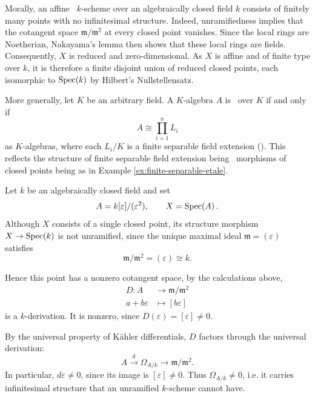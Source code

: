 \begin{remark}
	Morally, an affine \etale\ $k$-scheme over an algebraically
	closed field $k$ consists of finitely many points with no
	infinitesimal structure. Indeed, unramifiedness implies
	that the cotangent space $\mathfrak{m} / \mathfrak{m}^2$ at every closed point vanishes.
	Since the local rings are Noetherian, Nakayama's lemma
	then shows that these local rings are fields.
	Consequently, $X$ is reduced and zero-dimensional.
	As $X$ is affine and of finite type over $k$, it is
	therefore a finite disjoint union of reduced closed
	points, each isomorphic to $\operatorname{Spec}\!\left(k\right)$ by
	Hilbert's Nullstellensatz.
\end{remark}

\begin{remark}
	More generally, let $K$ be an arbitrary field.
	A $K$-algebra $A$ is \etale\ over $K$ if and only if
	\[
	A \cong \prod_{i=1}^{n} L_i
	\]
	as $K$-algebras, where each $L_i/K$ is a finite
	separable field extension
	(\cite[][Tag 02GL]{stacks-project}).
	This reflects the structure of finite separable field extension being \etale\ morphisms of closed points being as in Example \ref{ex:finite-separable-etale}.
\end{remark}

\begin{example}	
	Let $k$ be an algebraically closed field and set
	\[
	A = k[\varepsilon]/(\varepsilon^2),
	\qquad X=\operatorname{Spec}\!\left(A\right).
	\]
	Although $X$ consists of a single closed point,
	its structure morphism $X \to \operatorname{Spec}\!\left(k\right)$ is not
	unramified, since the unique maximal ideal
	$\mathfrak m=(\varepsilon)$ satisfies
	\[
	\mathfrak m/\mathfrak m^2
	=(\varepsilon)\cong k.
	\]
	
	Hence this point has a nonzero cotangent space, by the calculations above,
	\begin{align*}
		D:A&\longrightarrow\mathfrak m/\mathfrak m^2 \\
		 a+b\varepsilon&\longmapsto[b\varepsilon]
	\end{align*}
	is a $k$-derivation. It is nonzero, since
	$D(\varepsilon)=[\varepsilon]\neq 0$.
	
	
	By the universal property of K\"ahler differentials,
	$D$ factors through the universal derivation:
	\[
	A\xrightarrow{d}\Omega_{A/k}
	\longrightarrow\mathfrak m/\mathfrak m^2.
	\]
	In particular, $d\varepsilon\neq 0$, since its
	image is $[\varepsilon]\neq 0$.
	Thus $\Omega_{A/k}\neq 0$, i.e. it carries infinitesimal structure that an unramified $k$-scheme cannot have.
\end{example}

